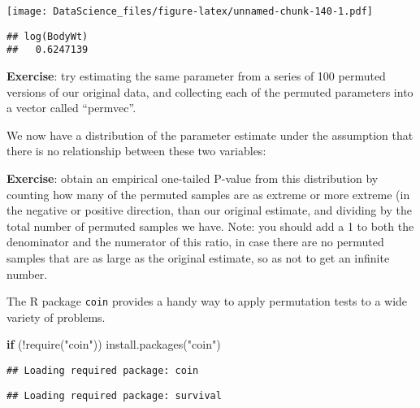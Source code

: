\documentclass[
]{book}
\newenvironment{Shaded}{\begin{snugshade}}{\end{snugshade}}
\newcommand{\AttributeTok}[1]{\textcolor[rgb]{0.77,0.63,0.00}{#1}}
\newcommand{\ControlFlowTok}[1]{\textcolor[rgb]{0.13,0.29,0.53}{\textbf{#1}}}
\newcommand{\DecValTok}[1]{\textcolor[rgb]{0.00,0.00,0.81}{#1}}
\newcommand{\FunctionTok}[1]{\textcolor[rgb]{0.00,0.00,0.00}{#1}}
\newcommand{\NormalTok}[1]{#1}
\newcommand{\OtherTok}[1]{\textcolor[rgb]{0.56,0.35,0.01}{#1}}
\newcommand{\SpecialCharTok}[1]{\textcolor[rgb]{0.00,0.00,0.00}{#1}}
\newcommand{\StringTok}[1]{\textcolor[rgb]{0.31,0.60,0.02}{#1}}
\begin{document}
\texttt{[image: DataScience\_files/figure-latex/unnamed-chunk-140-1.pdf]}

\begin{Shaded}
\end{Shaded}

\begin{verbatim}
## log(BodyWt) 
##   0.6247139
\end{verbatim}

\textbf{Exercise}: try estimating the same parameter from a series of 100 permuted versions of our original data, and collecting each of the permuted parameters into a vector called ``permvec''.

We now have a distribution of the parameter estimate under the assumption that there is no relationship between these two variables:

\textbf{Exercise}: obtain an empirical one-tailed P-value from this distribution by counting how many of the permuted samples are as extreme or more extreme (in the negative or positive direction, than our original estimate, and dividing by the total number of permuted samples we have. Note: you should add a 1 to both the denominator and the numerator of this ratio, in case there are no permuted samples that are as large as the original estimate, so as not to get an infinite number.

The R package \texttt{coin} provides a handy way to apply permutation tests to a wide variety of problems.

\begin{Shaded}
\begin{Highlighting}[]
\ControlFlowTok{if}\NormalTok{ (}\SpecialCharTok{!}\FunctionTok{require}\NormalTok{(}\StringTok{"coin"}\NormalTok{)) }\FunctionTok{install.packages}\NormalTok{(}\StringTok{"coin"}\NormalTok{)}
\end{Highlighting}
\end{Shaded}

\begin{verbatim}
## Loading required package: coin
\end{verbatim}

\begin{verbatim}
## Loading required package: survival
\end{verbatim}
\end{document}
